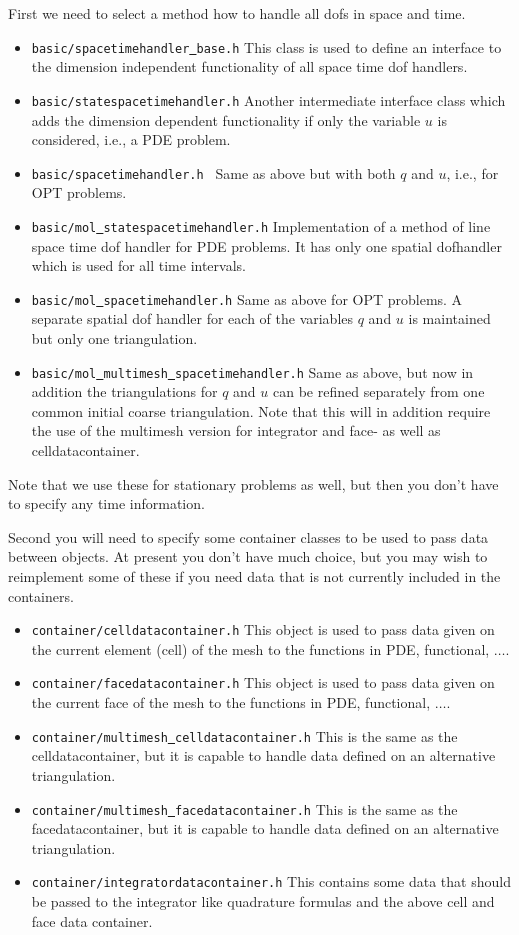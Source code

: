 First we need to select a method how to handle all dofs in space and time.
\begin{itemize}
\item {\tt basic/spacetimehandler\underline{ }base.h} This class is used to define 
  an interface to the dimension independent functionality of all space time dof handlers. 
\item {\tt basic/statespacetimehandler.h} Another intermediate interface class which adds 
  the dimension dependent functionality if only the variable $u$ is considered, i.e., a 
  PDE problem.
\item {\tt basic/spacetimehandler.h } Same as above but with both $q$ and $u$, i.e., for
  OPT problems.
\item {\tt basic/mol\underline{ }statespacetimehandler.h} Implementation of a method of 
  line space time dof handler for PDE problems. It has only one spatial 
  dofhandler which is used for all time intervals.
\item {\tt basic/mol\underline{ }spacetimehandler.h} Same as above for OPT problems.
  A separate spatial dof handler for each of the variables $q$ and $u$ is maintained 
  but only one triangulation.
\item {\tt basic/mol\underline{ }multimesh\underline{ }spacetimehandler.h}
  Same as above, but now in addition the triangulations for $q$ and $u$ can be refined
  separately from one common initial coarse triangulation. Note that this will
  in addition require the use of the multimesh version for integrator and 
  face- as well as celldatacontainer.
\end{itemize}
Note that we use these for stationary problems as well, but then you don't have to specify
any time information.

Second you will need to specify some container classes to be used to 
pass data between objects. At present you don't have much choice, but you may wish 
to reimplement some of these if you need data that is not currently included in 
the containers.
\begin{itemize}
\item {\tt container/celldatacontainer.h} This object is used to pass data 
  given on the current element (cell) of the mesh to the functions in PDE, functional, 
  $\ldots$. 
\item {\tt container/facedatacontainer.h} This object is used to pass data 
  given on the current face of the mesh to the functions in PDE, functional, 
  $\ldots$. 
\item {\tt container/multimesh\underline{ }celldatacontainer.h} This is the same as the 
  celldatacontainer, but it
  is capable to handle data defined on an alternative triangulation.
\item {\tt container/multimesh\underline{ }facedatacontainer.h} This is the same as the
  facedatacontainer, but it
  is capable to handle data defined on an alternative triangulation.
\item {\tt container/integratordatacontainer.h} This contains some data that 
  should be passed to the integrator like quadrature formulas and the above cell and 
  face data container.
\end{itemize}

